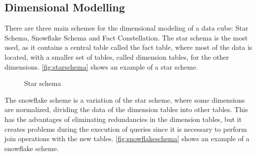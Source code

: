 \subsection{Dimensional Modelling}\label{ch:fun:cube:dimm}

There are three main schemes for the dimensional modeling of a data cube: Star Schema, Snowflake Schema and Fact Constellation.
The star schema is the most used, as it contains a central table called the fact table, where most of the data is located, with a smaller set of tables, called dimension tables, for the other dimensions.
\autoref{fig:starschema} shows an example of a star scheme.

\begin{figure}[!htb]
  \caption{Star schema}\label{fig:starschema}
  \vspace{6mm}
  \begin{center}
  \end{center}
  \vspace{1mm}
  \legenda{}
\end{figure}

The snowflake scheme is a variation of the star scheme, where some dimensions are normalized, dividing the data of the dimension tables into other tables.
This has the advantages of eliminating redundancies in the dimension tables, but it creates problems during the execution of queries since it is necessary to perform join operations with the new tables.
\autoref{fig:snowflakeschema} shows an example of a snowflake scheme.

